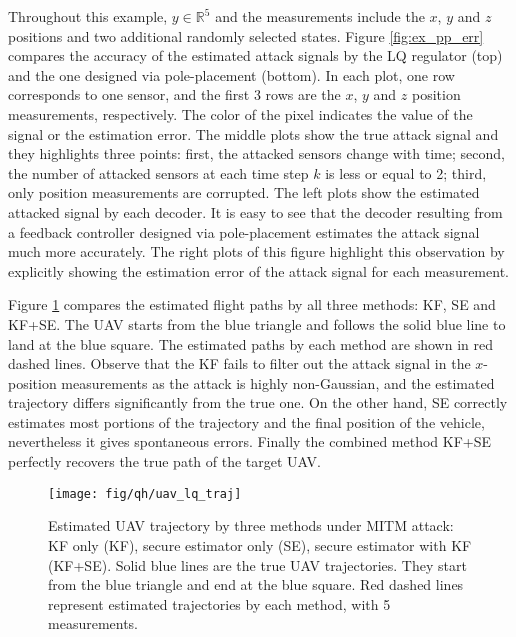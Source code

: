 \documentclass[12pt, conference, a4paper, twoside]{IEEEconf_mod}
\begin{document}
Throughout this example, $y \in \mathbb{R}^5$ and the measurements include the $x$, $y$ and $z$ positions and two additional randomly selected states. 
Figure \ref{fig:ex_pp_err} compares the accuracy of the estimated attack signals by the LQ regulator (top) and the one designed via pole-placement (bottom).
In each plot, one row corresponds to one sensor, and the first 3 rows are the $x$, $y$ and $z$ position measurements, respectively. The color of the pixel indicates the value of the signal or the estimation error.
The middle plots show the true attack signal and they highlights three points: first, the attacked sensors change with time; second, the number of attacked sensors at each time step $k$ is less or equal to 2; third, only position measurements are corrupted.
The left plots show the estimated attacked signal by each decoder. It is easy to see that the decoder resulting from a feedback controller designed via pole-placement estimates the attack signal much more accurately. 
The right plots of this figure highlight this observation by explicitly showing the estimation error of the attack signal for each measurement.

Figure \ref{fig:ex_uav_remote} compares the estimated flight paths by all three methods: KF, SE and KF+SE.
The UAV starts from the blue triangle and follows the solid blue line to land at the blue square. The estimated paths by each method are shown in red dashed lines. Observe that the KF fails to filter out the attack signal in the $x$-position measurements as the attack is highly non-Gaussian, and the estimated trajectory differs significantly from the true one. 
On the other hand, SE correctly estimates most portions of the trajectory and the final position of the vehicle, nevertheless it gives spontaneous errors. 
Finally the combined method KF+SE perfectly recovers the true path of the target UAV.



\begin{figure}
\center
\texttt{[image: fig/qh/uav\_lq\_traj]}
\caption{Estimated UAV trajectory by three methods under MITM attack: KF only (KF), secure estimator only (SE), secure estimator with KF (KF+SE). Solid blue lines are the true UAV trajectories. They start from the blue triangle and end at the blue square. Red dashed lines represent estimated trajectories by each method, with 5 measurements.}
\label{fig:ex_uav_remote}
\end{figure}
\end{document}
